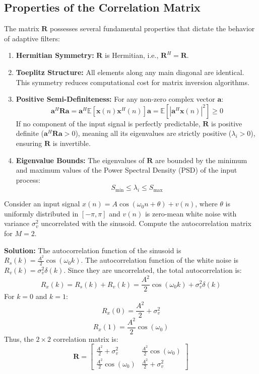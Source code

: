 \documentclass[12pt,a4paper]{article}
\begin{document}
\subsection{Properties of the Correlation Matrix}
The matrix $\mathbf{R}$ possesses several fundamental properties that dictate the behavior of adaptive filters:
\begin{enumerate}[label=\textbf{\arabic*.}, leftmargin=*, itemsep=4pt]
  \item \textbf{Hermitian Symmetry:} $\mathbf{R}$ is Hermitian, i.e., $\mathbf{R}^H = \mathbf{R}$.
  \item \textbf{Toeplitz Structure:} All elements along any main diagonal are identical. This symmetry reduces computational cost for matrix inversion algorithms.
  \item \textbf{Positive Semi-Definiteness:} For any non-zero complex vector $\mathbf{a}$:
  \begin{equation}
    \mathbf{a}^H \mathbf{R} \mathbf{a} = \mathbf{a}^H \mathbb{E}[\mathbf{x}(n)\mathbf{x}^H(n)]\mathbf{a} = \mathbb{E}[|\mathbf{a}^H\mathbf{x}(n)|^2] \ge 0
  \end{equation}
  If no component of the input signal is perfectly predictable, $\mathbf{R}$ is positive definite ($\mathbf{a}^H \mathbf{R} \mathbf{a} > 0$), meaning all its eigenvalues are strictly positive ($\lambda_i > 0$), ensuring $\mathbf{R}$ is invertible.
  \item \textbf{Eigenvalue Bounds:} The eigenvalues of $\mathbf{R}$ are bounded by the minimum and maximum values of the Power Spectral Density (PSD) of the input process:
  \begin{equation}
    S_{\text{min}} \le \lambda_i \le S_{\text{max}}
  \end{equation}
\end{enumerate}

\begin{tcolorbox}[examplebox, title={Example: Correlation Matrix of a Sinusoid with Noise}]
Consider an input signal $x(n) = A \cos(\omega_0 n + \theta) + v(n)$, where $\theta$ is uniformly distributed in $[-\pi, \pi]$ and $v(n)$ is zero-mean white noise with variance $\sigma_v^2$ uncorrelated with the sinusoid. Compute the autocorrelation matrix for $M = 2$.

\textbf{Solution:}
The autocorrelation function of the sinusoid is $R_s(k) = \frac{A^2}{2}\cos(\omega_0 k)$.
The autocorrelation function of the white noise is $R_v(k) = \sigma_v^2 \delta(k)$.
Since they are uncorrelated, the total autocorrelation is:
\[
  R_x(k) = R_s(k) + R_v(k) = \frac{A^2}{2}\cos(\omega_0 k) + \sigma_v^2 \delta(k)
\]
For $k=0$ and $k=1$:
\[
  R_x(0) = \frac{A^2}{2} + \sigma_v^2
\]
\[
  R_x(1) = \frac{A^2}{2}\cos(\omega_0)
\]
Thus, the $2 \times 2$ correlation matrix is:
\[
  \mathbf{R} = \begin{bmatrix}
    \frac{A^2}{2} + \sigma_v^2 & \frac{A^2}{2}\cos(\omega_0) \\
    \frac{A^2}{2}\cos(\omega_0) & \frac{A^2}{2} + \sigma_v^2
  \end{bmatrix}
\]
\end{tcolorbox}
\end{document}

